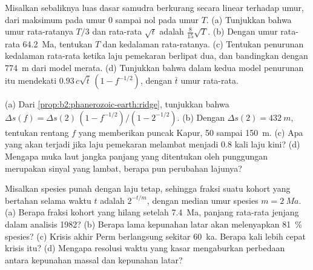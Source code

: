 \begin{exercise}[$\star\star\star$]\label{exo:b2:phanerozoic-earth:10}
Misalkan sebaliknya luas dasar samudra berkurang secara linear terhadap umur, dari maksimum pada umur 0 sampai nol
pada umur $T$. (a) Tunjukkan bahwa umur rata-ratanya $T/3$ dan rata-rata $\sqrt t$ adalah
$\tfrac{8}{15}\sqrt T$. (b) Dengan umur rata-rata \qty{64.2}{Ma}, tentukan $T$ dan kedalaman rata-ratanya. (c)
Tentukan penurunan kedalaman rata-rata ketika laju pemekaran berlipat dua, dan bandingkan dengan
\qty{774}{m} dari model merata. (d) Tunjukkan bahwa dalam kedua model penurunan itu mendekati $0.93\,c\sqrt{\bar
t}\,(1 - f^{-1/2})$, dengan $\bar t$ umur rata-rata.
\end{exercise}

\begin{exercise}[$\star\star\star$]\label{exo:b2:phanerozoic-earth:11}
(a) Dari \cref{prop:b2:phanerozoic-earth:ridge}, tunjukkan bahwa $\Delta s(f) = \Delta s(2)\,(1 -
f^{-1/2})/(1 - 2^{-1/2})$. (b) Dengan $\Delta s(2) = \qty{432}{m}$, tentukan rentang $f$ yang
memberikan puncak Kapur, 50 sampai \qty{150}{m}. (c) Apa yang akan terjadi jika laju pemekaran melambat menjadi 0.8 kali
laju kini? (d) Mengapa muka laut jangka panjang yang ditentukan oleh punggungan merupakan sinyal yang lambat, berapa pun perubahan
lajunya?
\end{exercise}

\begin{exercise}[$\star\star\star$]\label{exo:b2:phanerozoic-earth:12}
Misalkan spesies punah dengan laju tetap, sehingga fraksi suatu kohort yang bertahan selama waktu
$t$ adalah $2^{-t/m}$, dengan median umur spesies $m = \qty{2}{Ma}$. (a) Berapa fraksi
kohort yang hilang setelah \qty{7.4}{Ma}, panjang rata-rata jenjang dalam analisis 1982? (b) Berapa lama
kepunahan latar akan melenyapkan \qty{81}{\percent} spesies? (c) Krisis akhir Perm
berlangsung sekitar \qty{60}{ka}. Berapa kali lebih cepat krisis itu? (d) Mengapa resolusi waktu yang kasar
mengaburkan perbedaan antara kepunahan massal dan kepunahan latar?
\end{exercise}

